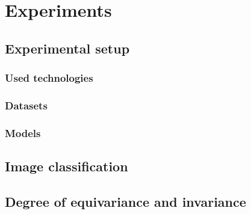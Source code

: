 \chapter{Experiments}
\section{Experimental setup}
    \subsection{Used technologies}
    \subsection{Datasets}
    \subsection{Models}

\section{Image classification}

\section{Degree of equivariance and invariance}

